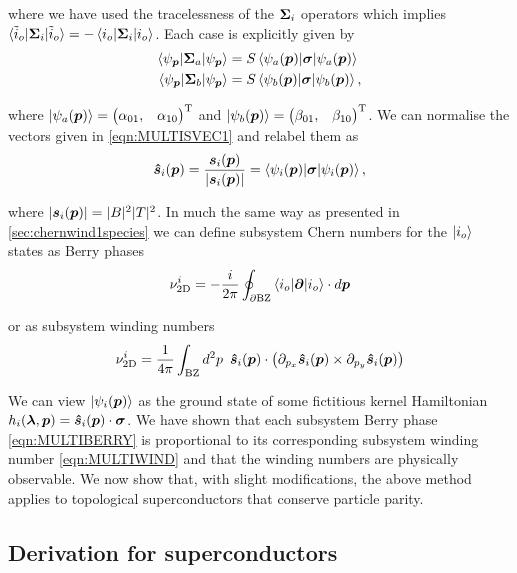 \noi where we have used the tracelessness of the $\boldsymbol{\Sigma}_{i}$ operators which implies $\braket{\tilde{i}_{o}|\boldsymbol{\Sigma}_{i}|\tilde{i}_{o}}=-\braket{i_{o}|\boldsymbol{\Sigma}_{i}|i_{o}}$. Each case is explicitly given by 
\begin{align}\label{eqn:MULTISVEC1}
    \braket{\psi_{\boldsymbol{p}}|\boldsymbol{\Sigma}_{a}|\psi_{\boldsymbol{p}}}&=S\braket{\psi_{a}(\boldsymbol{p})|\boldsymbol{\sigma}|\psi_{a}(\boldsymbol{p})}\nonumber\\
    \braket{\psi_{\boldsymbol{p}}|\boldsymbol{\Sigma}_{b}|\psi_{\boldsymbol{p}}}&=S\braket{\psi_{b}(\boldsymbol{p})|\boldsymbol{\sigma}|\psi_{b}(\boldsymbol{p})},
\end{align}

\noi where $\ket{\psi_{a}(\boldsymbol{p})}=\begin{pmatrix} \alpha_{01},&\alpha_{10}\end{pmatrix}^{\text{T}}$ and $\ket{\psi_{b}(\boldsymbol{p})}=\begin{pmatrix} \beta_{01},&\beta_{10}\end{pmatrix}^{\text{T}}$. We can normalise the vectors given in \eqref{eqn:MULTISVEC1} and relabel them as
\begin{equation}
    \boldsymbol{\hat{s}}_{i}(\boldsymbol{p})=\frac{\boldsymbol{s}_{i}(\boldsymbol{p})}{|\boldsymbol{s}_{i}(\boldsymbol{p})|}=\braket{\psi_{i}(\boldsymbol{p})|\boldsymbol{\sigma}|\psi_{i}(\boldsymbol{p})},
\end{equation}

\noi where $|\boldsymbol{s}_{i}(\boldsymbol{p})|=|B|^{2}|T|^{2}$. In much the same way as presented in \ref{sec:chernwind1species} we can define subsystem Chern numbers for the $\ket{i_{o}}$ states as Berry phases
\begin{equation}\label{eqn:MULTIBERRY}
    \nu_{\text{2D}}^{i}=-\frac{i}{2\pi}\oint_{\partial \text{BZ}}\braket{i_{o}|\boldsymbol{\partial}|i_{o}}\cdot d\boldsymbol{p}
\end{equation}

\noi or as subsystem winding numbers
\begin{equation}\label{eqn:MULTIWIND}
    \nu_{\text{2D}}^{i} =\frac{1}{4\pi}\int_{\text{BZ}} d^{2}p\,\,\, \boldsymbol{\hat{s}}_{i}(\boldsymbol{p})\cdot\big(\partial_{p_{x}}\boldsymbol{\hat{s}}_{i}(\boldsymbol{p})\times\partial_{p_{y}}\boldsymbol{\hat{s}}_{i}(\boldsymbol{p})\big)
\end{equation}

\noi We can view $\ket{\psi_{i}(\boldsymbol{p})}$ as the ground state of some fictitious kernel Hamiltonian $h_{i}(\boldsymbol{\lambda},\boldsymbol{p})=\boldsymbol{\hat{s}}_{i}(\boldsymbol{p})\cdot\boldsymbol{\sigma}$. We have shown that each subsystem Berry phase \eqref{eqn:MULTIBERRY} is proportional to its corresponding subsystem winding number \eqref{eqn:MULTIWIND} and that the winding numbers are physically observable. We now show that, with slight modifications, the above method applies to topological superconductors that conserve particle parity.

\subsection{Derivation for superconductors}

